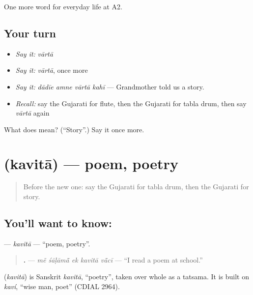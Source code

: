 \begin{grammarlens}[title={What you've built}]
One more word for everyday life at A2.
\end{grammarlens}

\subsection*{Your turn}
\begin{itemize}
\raggedright
  \item \emph{Say it:} \emph{vārtā}
  \item \emph{Say it:} \emph{vārtā}, once more
  \item \emph{Say it:} \emph{dādīe amne vārtā kahī} — Grandmother told us a story.
  \item \emph{Recall:} say the Gujarati for flute, then the Gujarati for tabla drum, then say \emph{vārtā} again
\end{itemize}

\begin{tcolorbox}[breakable,colback=teal!4,colframe=teal!35!black,title={Before you move on}]
What does  mean? (\textquotedblleft{}Story\textquotedblright{}.) Say it once more.
\end{tcolorbox}
\section[\texorpdfstring{\gu{કવિતા} (kavitā)}{કવિતા (kavitā)}]{ (kavitā) — poem, poetry}

\label{lesson:GU-C255-kavita}



\begin{quote}
Before the new one: say the Gujarati for tabla drum, then the Gujarati for story.
\end{quote}

\subsection*{You'll want to know: }
\textbf{} — \emph{kavitā} — \textquotedblleft{}poem, poetry\textquotedblright{}.

\begin{quote}
\textbf{    .} — \emph{mẽ śāḷāmā̃ ek kavitā vā̃cī} — \textquotedblleft{}I read a poem at school.\textquotedblright{}
\end{quote}

\begin{cousinweb}
\textbf{} (\emph{kavitā}) is Sanskrit \emph{kavitā}, \textquotedblleft{}poetry\textquotedblright{}, taken over whole as a tatsama. It is built on \emph{kaví}, \textquotedblleft{}wise man, poet\textquotedblright{} (CDIAL 2964).
\end{cousinweb}

